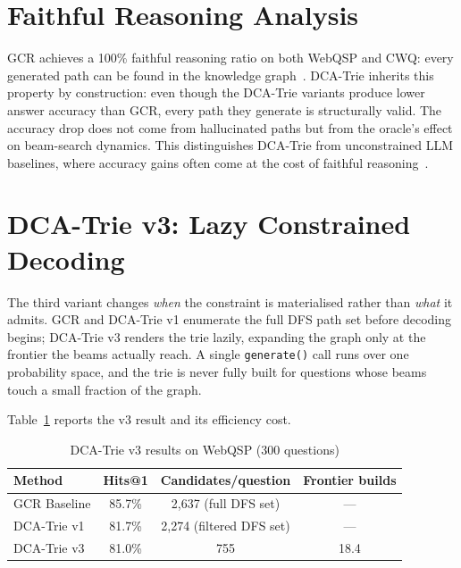\section{Faithful Reasoning Analysis}
\label{sec:ch4faithful}

GCR achieves a 100\% faithful reasoning ratio on both WebQSP and CWQ: every generated path can be found in the knowledge graph~\citep{luo2025-graph-constrained-reasoning}. DCA-Trie inherits this property by construction: even though the DCA-Trie variants produce lower answer accuracy than GCR, every path they generate is structurally valid. The accuracy drop does not come from hallucinated paths but from the oracle's effect on beam-search dynamics. This distinguishes DCA-Trie from unconstrained LLM baselines, where accuracy gains often come at the cost of faithful reasoning~\citep{luo2025-graph-constrained-reasoning}.

\section{DCA-Trie v3: Lazy Constrained Decoding}
\label{sec:ch4v3}

The third variant changes \textit{when} the constraint is materialised rather than \textit{what} it admits. GCR and DCA-Trie v1 enumerate the full DFS path set before decoding begins; DCA-Trie v3 renders the trie lazily, expanding the graph only at the frontier the beams actually reach. A single \texttt{generate()} call runs over one probability space, and the trie is never fully built for questions whose beams touch a small fraction of the graph.

Table~\ref{tab:v3_results} reports the v3 result and its efficiency cost.

\begin{table}[H]
  \centering
  \caption[DCA-Trie v3 Results]{DCA-Trie v3 results on WebQSP (300 questions)}
  \label{tab:v3_results}
  \begin{tabularx}{\textwidth}{|X|c|c|c|}
    \hline
    \textbf{Method} & \textbf{Hits@1} & \textbf{Candidates/question} & \textbf{Frontier builds} \\
    \hline
    GCR Baseline    & 85.7\%          & 2,637 (full DFS set)         & ---                     \\
    \hline
    DCA-Trie v1     & 81.7\%          & 2,274 (filtered DFS set)     & ---                     \\
    \hline
    DCA-Trie v3     & 81.0\%          & 755                           & 18.4                    \\
    \hline
  \end{tabularx}
\end{table}

